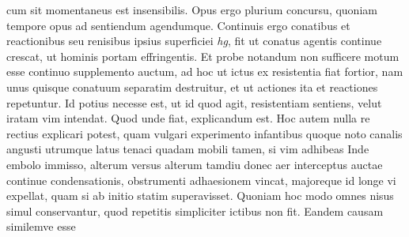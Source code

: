 cum sit momentaneus%
est insensibilis.%
Opus ergo plurium concursu,%
%
%
quoniam tempore opus ad sentiendum agendumque.
Continuis ergo conatibus%
et reactionibus%
seu renisibus%
ipsius superficiei \textit{hg},
fit ut conatus agentis%
continue crescat,%
ut hominis portam effringentis.%
%
Et probe notandum
non sufficere
motum esse continuo supplemento auctum,%
ad hoc
ut ictus ex resistentia%
fiat fortior,
nam unus quisque conatuum separatim destruitur,%
et ut actiones ita et reactiones repetuntur.%
%
%
Id potius necesse est,
ut id quod agit,%
resistentiam sentiens,%
velut iratam vim intendat.%
Quod unde fiat,
explicandum est.
\pend%
\newpage%
\pstart%
Hoc autem nulla re rectius explicari potest,
quam vulgari experimento%
%
infantibus quoque noto%
%
\bracks{:}
canalis angusti utrumque latus%
tenaci quadam%
mobili tamen,%
si vim adhibeas%
Inde embolo immisso,%
alterum %
versus alterum
tamdiu
donec aer interceptus%
auctae continue condensationis,%
obstrumenti adhaesionem vincat,%
%
majoreque id longe vi%
expellat,
quam si ab initio statim superavisset.
Quoniam hoc modo omnes nisus simul conservantur,%
quod repetitis simpliciter ictibus non fit.%
Eandem causam similemve esse
